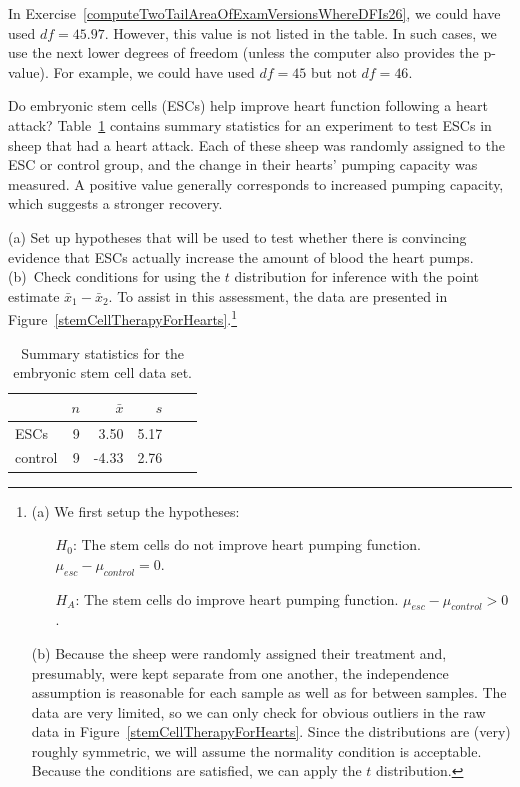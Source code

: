 In Exercise~\ref{computeTwoTailAreaOfExamVersionsWhereDFIs26}, we could have used $df=45.97$. However, this value is not listed in the table. In such cases, we use the next lower degrees of freedom (unless the computer also provides the p-value). For example, we could have used $df=45$ but not $df=46$. 


\begin{exercise} \label{exerciseToEvaluteWhetherESCsAreHelpfulInImprovingHeartFunctionInSheep}
Do embryonic stem cells (ESCs) help improve heart function following a heart attack? Table~\ref{summaryStatsForSheepHeartDataWhoReceivedMiceESCs} contains summary statistics for an experiment to test ESCs in sheep that had a heart attack. Each of these sheep was randomly assigned to the ESC or control group, and the change in their hearts' pumping capacity was measured. A positive value generally corresponds to increased pumping capacity, which suggests a stronger recovery. 

(a) Set up hypotheses that will be used to test whether there is convincing evidence that ESCs actually increase the amount of blood the heart pumps. (b)~Check conditions for using the $t$ distribution for inference with the point estimate $\bar{x}_1 - \bar{x}_2$. To assist in this assessment, the data are presented in Figure~\ref{stemCellTherapyForHearts}.\footnote{(a) We first setup the hypotheses:
\begin{itemize}
\setlength{\itemsep}{0mm}
\item[$H_0$:] The stem cells do not improve heart pumping function. $\mu_{esc} - \mu_{control} = 0$.
\item[$H_A$:] The stem cells do improve heart pumping function. $\mu_{esc} - \mu_{control} > 0$.
\end{itemize}
(b) Because the sheep were randomly assigned their treatment and, presumably, were kept separate from one another, the independence assumption is reasonable for each sample as well as for between samples. The data are very limited, so we can only check for obvious outliers in the raw data in Figure~\ref{stemCellTherapyForHearts}. Since the distributions are (very) roughly symmetric, we will assume the normality condition is acceptable. Because the conditions are satisfied, we can apply the $t$ distribution.}
\end{exercise}

\begin{table}[h]
\centering
\begin{tabular}{l rrrrr}
\hline
\hspace{10mm}	& $n$	& $\bar{x}$	& $s$  	 \\
\hline
ESCs		& 9		& 3.50		& 5.17  	\\
control		& 9		& -4.33		& 2.76  	 \\
\hline
\end{tabular}
\caption{Summary statistics for the embryonic stem cell data set.}
\label{summaryStatsForSheepHeartDataWhoReceivedMiceESCs}
\end{table}

